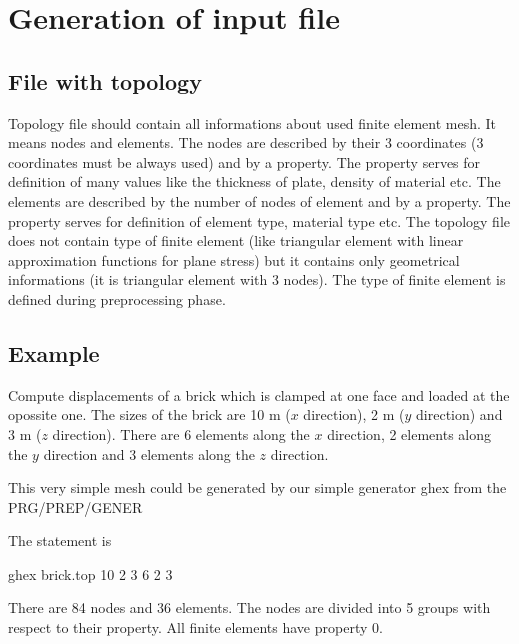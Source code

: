 \chapter{Generation of input file}


\section{File with topology}
Topology file should contain all informations about used finite element mesh.
It means nodes and elements. The nodes are described by their 3 coordinates
(3 coordinates must be always used) and by a property. The property serves
for definition of many values like the thickness of plate, density of material etc.
The elements are described by the number of nodes of element and by a property.
The property serves for definition of element type, material type etc. The topology
file does not contain type of finite element (like triangular element with linear
approximation functions for plane stress) but it contains only geometrical
informations (it is triangular element with 3 nodes). The type of finite element
is defined during preprocessing phase.

\section{Example}

Compute displacements of a brick which is clamped at one face and loaded at the
opossite one. The sizes of the brick are 10 m ($x$ direction), 2 m ($y$ direction) and
3 m ($z$ direction). There are 6 elements along the $x$ direction, 2 elements
along the $y$ direction and 3 elements along the $z$ direction.

This very simple mesh could be generated by our simple generator ghex from the
PRG/PREP/GENER

The statement is

ghex brick.top 10 2 3 \hspace{4mm} 6 2 3

There are 84 nodes and 36 elements. The nodes are divided into 5 groups with respect
to their property. All finite elements have property 0.


